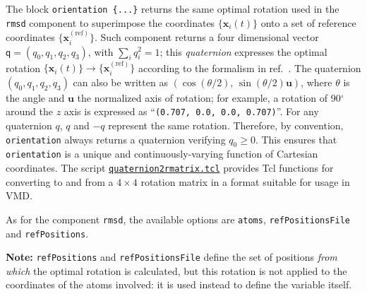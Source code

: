 The block \texttt{orientation~\{...\}} returns the
same optimal rotation used in the \texttt{rmsd} component to
superimpose the coordinates $\{\mathbf{x}_{i}(t)\}$ onto a set of
reference coordinates $\{\mathbf{x}_{i}^{\mathrm{(ref)}}\}$.  Such
component returns a four dimensional vector $\mathsf{q} = (q_0, q_1,
q_2, q_3)$, with $\sum_{i} q_{i}^{2} = 1$; this \emph{quaternion}
expresses the optimal rotation $\{\mathbf{x}_{i}(t)\} \rightarrow
\{\mathbf{x}_{i}^{\mathrm{(ref)}}\}$ according to the formalism in
ref.\ \citealp{Coutsias2004}.
The quaternion $(q_0, q_1, q_2, q_3)$
can also be written as $\left(\cos(\theta/2), \,
  \sin(\theta/2)\mathbf{u}\right)$, where $\theta$ is the angle and
$\mathbf{u}$ the normalized axis of rotation; for example, a rotation
of 90$^{\circ}$ around the $z$ axis is expressed as
``\texttt{(0.707, 0.0, 0.0, 0.707)}''.
For any quaternion $q$, $q$ and $-q$ represent the same rotation. Therefore, by convention, \texttt{orientation} always returns a quaternion verifying $q_0 \ge 0$. This ensures that \texttt{orientation} is a unique and continuously-varying function of Cartesian coordinates.
The script
\href{https://raw.githubusercontent.com/Colvars/colvars/master/colvartools/quaternion2rmatrix.tcl}{\texttt{quaternion2rmatrix.tcl}} provides Tcl functions for converting
to and from a $4\times{}4$ rotation matrix in a format suitable for
usage in VMD.

As for the component \texttt{rmsd}, the available options are \texttt{atoms}, \texttt{refPositionsFile} and \texttt{refPositions}.

\textbf{Note:} \texttt{refPositions} and \texttt{refPositionsFile} define the set of positions \emph{from which} the optimal rotation is calculated, but this rotation is not applied to the coordinates of the atoms involved: it is used instead to define the variable itself.

